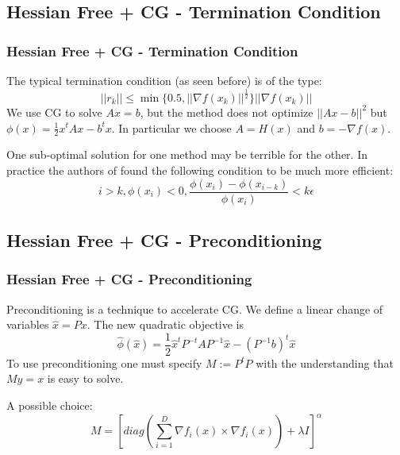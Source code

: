 \documentclass[professionalfont]{beamer}
\begin{document}
  \subsection{Hessian Free + CG - Termination Condition}
	\begin{frame}
	  \frametitle{Hessian Free + CG - Termination Condition}
    The typical termination condition (as seen before) is of the type:
    \begin{equation}
      ||r_k|| \leq \min{\{ 0.5, ||\nabla f(x_k)||^{\frac{1}{2}}\}} ||\nabla f(x_k)||
    \end{equation}
    We use CG to solve $Ax = b$, but the method does not optimize $||Ax - b||^2$ but $\phi(x) = \frac{1}{2}x^{t} A x - b^{t}x$.
    In particular we choose $A = H(x)$ and $b = -\nabla f(x)$.\newline \newline

    One sub-optimal solution for one method may be terrible for the other.\newline
    In practice the authors of \cite{martens} found the following condition to be much more efficient:
    \begin{equation}
      i > k, \phi(x_i) < 0, \frac{\phi(x_i) - \phi(x_{i-k})}{\phi(x_i)} < k\epsilon
    \end{equation}
	\end{frame}

  \subsection{Hessian Free + CG - Preconditioning}
	\begin{frame}
	  \frametitle{Hessian Free + CG - Preconditioning}
    Preconditioning is a technique to accelerate CG.\newline
    We define a linear change of variables $\hat{x} = Px$.\newline
    The new quadratic objective is
    \begin{equation*}
      \hat{\phi}(\hat{x}) = \frac{1}{2} \hat{x}^{t} P^{-t} A P^{-1} \hat{x} - (P^{-1}b)^{t} \hat{x}
    \end{equation*}
    To use preconditioning one must specify $M := P^{t}P$ with the understanding that $My = x$ is easy to solve.\newline\newline

    A possible choice:
    \begin{equation}
      M = \left[ diag \left ( \sum_{i=1}^{D} \nabla f_{i}(x) \times \nabla f_{i}(x)\right ) + \lambda I \right ]^{\alpha}
    \end{equation}
  \end{frame}
\end{document}
